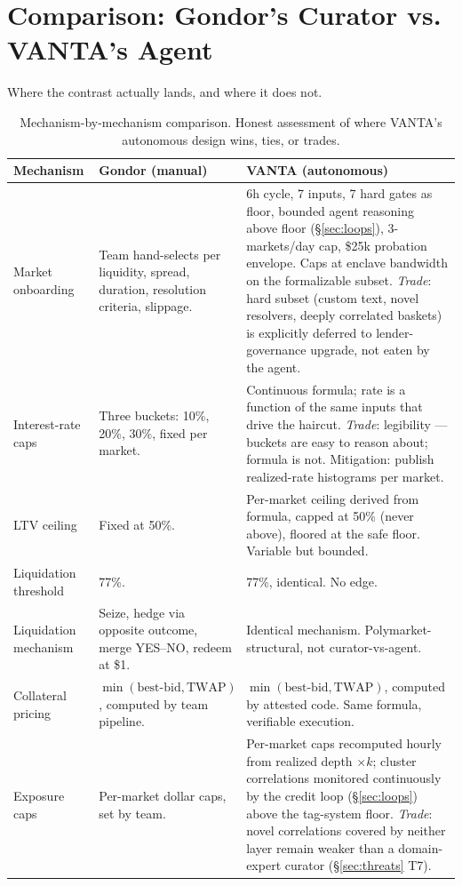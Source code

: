 \documentclass[11pt,letterpaper]{article}
\begin{document}
\section{Comparison: Gondor's Curator vs. VANTA's Agent}
\label{sec:compare}

Where the contrast actually lands, and where it does not.

\begin{table}[h]
\centering
\footnotesize
\caption{Mechanism-by-mechanism comparison. Honest assessment of where VANTA's autonomous design wins, ties, or trades.}
\label{tab:compare}
\begin{tabularx}{\textwidth}{@{}p{}p{}X@{}}
\toprule
\textbf{Mechanism} & \textbf{Gondor (manual)} & \textbf{VANTA (autonomous)} \\
\midrule
Market onboarding & Team hand-selects per liquidity, spread, duration, resolution criteria, slippage. & 6h cycle, 7 inputs, 7 hard gates as floor, bounded agent reasoning above floor (\S\ref{sec:loops}), 3-markets/day cap, \$25k probation envelope. Caps at enclave bandwidth on the formalizable subset. \emph{Trade}: hard subset (custom text, novel resolvers, deeply correlated baskets) is explicitly deferred to lender-governance upgrade, not eaten by the agent. \\
Interest-rate caps & Three buckets: 10\%, 20\%, 30\%, fixed per market. & Continuous formula; rate is a function of the same inputs that drive the haircut. \emph{Trade}: legibility --- buckets are easy to reason about; formula is not. Mitigation: publish realized-rate histograms per market. \\
LTV ceiling & Fixed at 50\%. & Per-market ceiling derived from formula, capped at 50\% (never above), floored at the safe floor. Variable but bounded. \\
Liquidation threshold & 77\%. & 77\%, identical. No edge. \\
Liquidation mechanism & Seize, hedge via opposite outcome, merge YES--NO, redeem at \$1. & Identical mechanism. Polymarket-structural, not curator-vs-agent. \\
Collateral pricing & $\min(\text{best-bid}, \text{TWAP})$, computed by team pipeline. & $\min(\text{best-bid}, \text{TWAP})$, computed by attested code. Same formula, verifiable execution. \\
Exposure caps & Per-market dollar caps, set by team. & Per-market caps recomputed hourly from realized depth $\times k$; cluster correlations monitored continuously by the credit loop (\S\ref{sec:loops}) above the tag-system floor. \emph{Trade}: novel correlations covered by neither layer remain weaker than a domain-expert curator (\S\ref{sec:threats} T7). \\

\end{tabularx}
\end{table}
\end{document}
